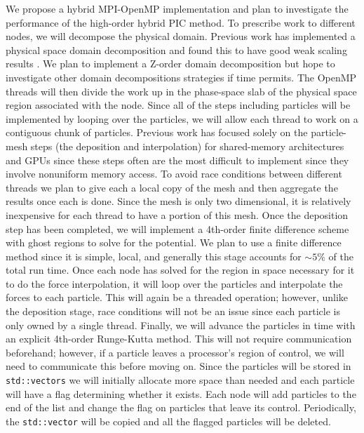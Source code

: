 \documentclass[aps,12pt, notitlepage]{revtex4-1}
\renewcommand{\=}[1]{\overline{#1}}
\begin{document}
We propose a hybrid MPI-OpenMP implementation and plan to investigate the performance of the high-order hybrid PIC method. 
To prescribe work to different nodes, we will decompose the physical domain. Previous work has implemented a physical space domain decomposition and found this to have good weak scaling results \cite{wang2011particle}.
We plan to implement a Z-order domain decomposition but hope to investigate other domain decompositions strategies if time permits. 
The OpenMP threads will then divide the work up in the phase-space slab of the physical space region associated with the node.
Since all of the steps including particles will be implemented by looping over the particles, we will allow each thread to work on a contiguous chunk of particles.  
Previous work has focused solely on the particle-mesh steps (the deposition and interpolation) for shared-memory architectures \cite{madduri2012optimization} and GPUs \cite{stantchev2008fast, buyukkecceci2013portable} since these steps often are the most difficult to implement since they involve nonuniform memory access. 
To avoid race conditions between different threads we plan to give each a local copy of the mesh and then aggregate the results once each is done. 
Since the mesh is only two dimensional, it is relatively inexpensive for each thread to have a portion of this mesh. 
Once the deposition step has been completed, we will implement a 4th-order finite difference scheme with ghost regions to solve for the potential.
We plan to use a finite difference method since it is simple, local, and generally this stage accounts for $\sim 5\%$ of the total run time. 
Once each node has solved for the region in space necessary for it to do the force interpolation, it will loop over the particles and interpolate the forces to each particle.
This will again be a threaded operation; however, unlike the deposition stage, race conditions will not be an issue since each particle is only owned by a single thread. 
Finally, we will advance the particles in time with an explicit 4th-order Runge-Kutta method.
This will not require communication beforehand; however, if a particle leaves a processor's region of control, we will need to communicate this before moving on. 
Since the particles will be stored in \texttt{std::vectors} we will initially allocate more space than needed and each particle will have a flag determining whether it exists. 
Each node will add particles to the end of the list and change the flag on particles that leave its control.  
Periodically, the \texttt{std::vector} will be copied and all the flagged particles will be deleted. 
\end{document}
